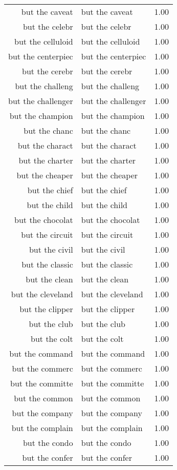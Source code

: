 \begin{table}[ht]
\begin{tabular}{rlr}
  but the caveat & but the caveat & 1.00 \\ 
  but the celebr & but the celebr & 1.00 \\ 
  but the celluloid & but the celluloid & 1.00 \\ 
  but the centerpiec & but the centerpiec & 1.00 \\ 
  but the cerebr & but the cerebr & 1.00 \\ 
  but the challeng & but the challeng & 1.00 \\ 
  but the challenger & but the challenger & 1.00 \\ 
  but the champion & but the champion & 1.00 \\ 
  but the chanc & but the chanc & 1.00 \\ 
  but the charact & but the charact & 1.00 \\ 
  but the charter & but the charter & 1.00 \\ 
  but the cheaper & but the cheaper & 1.00 \\ 
  but the chief & but the chief & 1.00 \\ 
  but the child & but the child & 1.00 \\ 
  but the chocolat & but the chocolat & 1.00 \\ 
  but the circuit & but the circuit & 1.00 \\ 
  but the civil & but the civil & 1.00 \\ 
  but the classic & but the classic & 1.00 \\ 
  but the clean & but the clean & 1.00 \\ 
  but the cleveland & but the cleveland & 1.00 \\ 
  but the clipper & but the clipper & 1.00 \\ 
  but the club & but the club & 1.00 \\ 
  but the colt & but the colt & 1.00 \\ 
  but the command & but the command & 1.00 \\ 
  but the commerc & but the commerc & 1.00 \\ 
  but the committe & but the committe & 1.00 \\ 
  but the common & but the common & 1.00 \\ 
  but the company & but the company & 1.00 \\ 
  but the complain & but the complain & 1.00 \\ 
  but the condo & but the condo & 1.00 \\ 
  but the confer & but the confer & 1.00 \\ 

\end{tabular}
\end{table}
